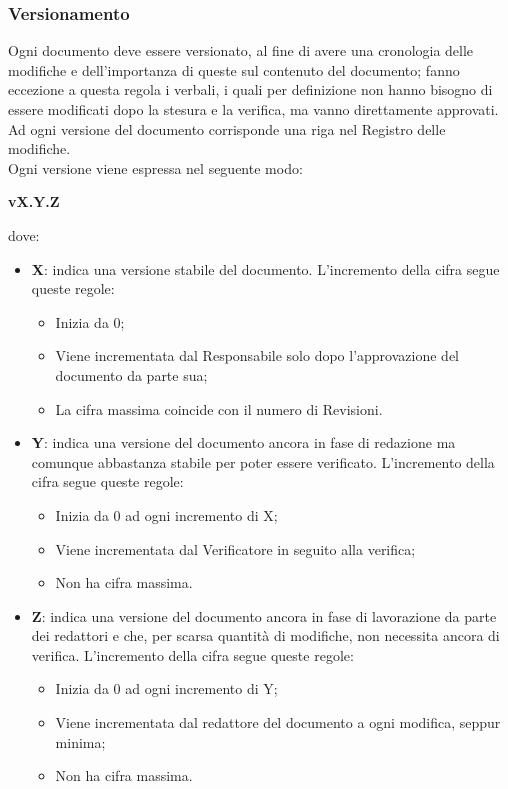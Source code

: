 \documentclass[../norme-di-progetto.tex]{subfiles}
\begin{document}
\subsubsection{Versionamento}
Ogni documento deve essere versionato, al fine di avere una cronologia delle modifiche e dell'importanza di queste sul contenuto del documento; fanno eccezione a questa regola i verbali, i quali per definizione non hanno bisogno di essere modificati dopo la stesura e la verifica, ma vanno direttamente approvati. Ad ogni versione del documento corrisponde una riga nel Registro delle modifiche. \\
Ogni versione viene espressa nel seguente modo: \\ \begin{center}
  \centering
  \textbf{vX.Y.Z}
\end{center} dove:
\begin{itemize}
  \item \textbf{X}: indica una versione stabile del documento. L'incremento della cifra segue queste regole:
  \begin{itemize}
    \item Inizia da 0;
    \item Viene incrementata dal Responsabile solo dopo l'approvazione del documento da parte sua;
    \item La cifra massima coincide con il numero di Revisioni.
  \end{itemize}
  \item \textbf{Y}: indica una versione del documento ancora in fase di redazione ma comunque abbastanza stabile per poter essere verificato. L'incremento della cifra segue queste regole:
  \begin{itemize}
    \item Inizia da 0 ad ogni incremento di X;
    \item Viene incrementata dal Verificatore in seguito alla verifica;
    \item Non ha cifra massima.
  \end{itemize}
  \item \textbf{Z}: indica una versione del documento ancora in fase di lavorazione da parte dei redattori e che, per scarsa quantità di modifiche, non necessita ancora di verifica. L'incremento della cifra segue queste regole:
  \begin{itemize}
    \item Inizia da 0 ad ogni incremento di Y;
    \item Viene incrementata dal redattore del documento a ogni modifica, seppur minima;
    \item Non ha cifra massima.
  \end{itemize}
\end{itemize}
\end{document}
